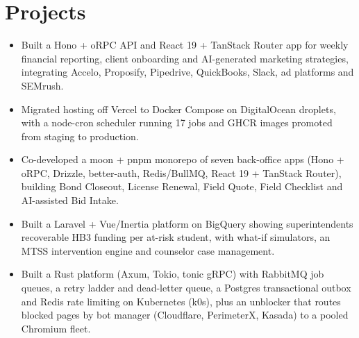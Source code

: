 \section*{Projects}
\begin{itemize}[leftmargin=*, topsep=0pt]
    \item Built a Hono + oRPC API and React 19 + TanStack Router app for weekly financial reporting, client onboarding and AI-generated marketing strategies, integrating Accelo, Proposify, Pipedrive, QuickBooks, Slack, ad platforms and SEMrush.
    \item Migrated hosting off Vercel to Docker Compose on DigitalOcean droplets, with a node-cron scheduler running 17 jobs and GHCR images promoted from staging to production.
\end{itemize}
\vspace{0.5em}
\begin{itemize}[leftmargin=*, topsep=0pt]
    \item Co-developed a moon + pnpm monorepo of seven back-office apps (Hono + oRPC, Drizzle, better-auth, Redis/BullMQ, React 19 + TanStack Router), building Bond Closeout, License Renewal, Field Quote, Field Checklist and AI-assisted Bid Intake.
\end{itemize}
\vspace{0.5em}
\begin{itemize}[leftmargin=*, topsep=0pt]
    \item Built a Laravel + Vue/Inertia platform on BigQuery showing superintendents recoverable HB3 funding per at-risk student, with what-if simulators, an MTSS intervention engine and counselor case management.
\end{itemize}
\vspace{0.5em}
\begin{itemize}[leftmargin=*, topsep=0pt]
    \item Built a Rust platform (Axum, Tokio, tonic gRPC) with RabbitMQ job queues, a retry ladder and dead-letter queue, a Postgres transactional outbox and Redis rate limiting on Kubernetes (k0s), plus an unblocker that routes blocked pages by bot manager (Cloudflare, PerimeterX, Kasada) to a pooled Chromium fleet.
\end{itemize}
